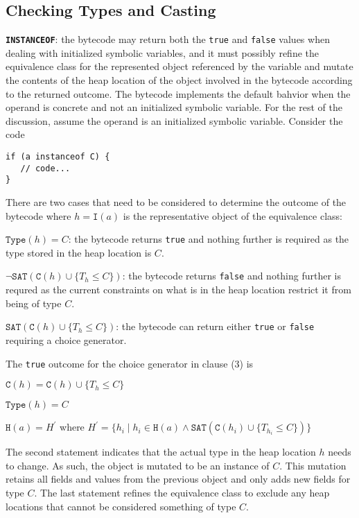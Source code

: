 \subsection{Checking Types and Casting}
\noindent\textbf{\texttt{INSTANCEOF}}: the bytecode may return both the \texttt{true} and \texttt{false} values when dealing with initialized symbolic variables, and it must possibly refine the equivalence class for the represented object referenced by the variable and mutate the contents of the heap location of the object involved in the bytecode according to the returned outcome. The bytecode implements the default bahvior when the operand is concrete and not an initialized symbolic variable. For the rest of the discussion, assume the operand is an initialized symbolic variable.
Consider the code
\begin{lstlisting}
if (a instanceof C) {
   // code...
}
\end{lstlisting}
There are two cases that need to be considered to determine the outcome of the bytecode where $h = \mathtt{I}(a)$ is the representative object of the equivalence class:
\begin{compactenum}
\item $\mathtt{Type}(h) = C$: the bytecode returns \texttt{true} and nothing further is required as the type stored in the heap location is $C$.
\item $\neg \mathtt{SAT}(\mathtt{C}(h) \cup \{T_h \leq C\})$: the bytecode returns \texttt{false} and nothing further is requred as the current constraints on what is in the heap location restrict it from being of type $C$.
\item $\mathtt{SAT}(\mathtt{C}(h) \cup \{T_h \leq C\})$: the bytecode can return either \texttt{true} or \texttt{false} requiring a choice generator.
\end{compactenum}
%
\noindent The \texttt{true} outcome for the choice generator in clause (3) is
\begin{compactitem}
    \item $\mathtt{C}(h) = \mathtt{C}(h) \cup \{T_h \leq C\}$
    \item $\mathtt{Type}(h) = C$
    \item $\mathtt{H}(a) = H^\prime$ where $H^\prime = \{h_i \mid h_i \in \mathtt{H}(a) \wedge \mathtt{SAT}(\mathtt{C}(h_i) \cup \{T_{h_i} \leq C\})\}$ 
\end{compactitem}
The second statement indicates that the actual type in the heap location $h$ needs to change. As such, the object is mutated to be an instance of $C$. This mutation retains all fields and values from the previous object and only adds new fields for type $C$. The last statement refines the equivalence class to exclude any heap locations that cannot be considered something of type $C$. 

